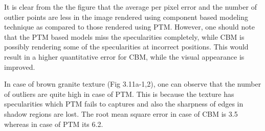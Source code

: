 

It is clear from the the figure that the average per pixel error and the number
of outlier points are less in the image rendered using component based modeling
technique as compared to those rendered using PTM. However, one should note that
the PTM based models miss the specularities completely, while CBM is possibly
rendering some of the specularities at incorrect positions. This would result in
a higher quantitative error for CBM, while the visual appearance is improved.

In case of brown granite texture (Fig 3.11a-1,2), one can observe that the number
of outliers are quite high in case of PTM. This is because the texture has
specularities which PTM fails to captures and also the sharpness of edges in
shadow regions are lost. The root mean square error in case of CBM is 3.5 whereas in case of PTM its 6.2. 
